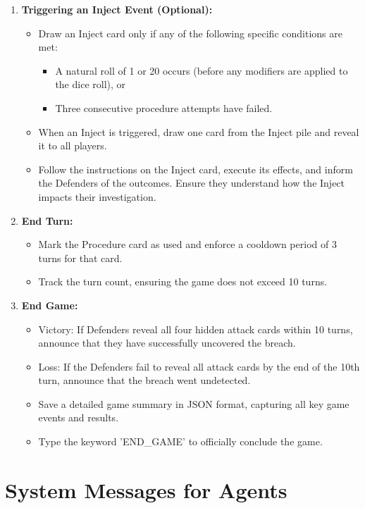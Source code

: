 \documentclass[letterpaper]{article} %
\begin{document}
\begin{enumerate}
    \item \textbf{Triggering an Inject Event (Optional):}
    \begin{itemize}
        \item Draw an Inject card only if any of the following specific conditions are met:
        \begin{itemize}
            \item A natural roll of 1 or 20 occurs (before any modifiers are applied to the dice roll), or
            \item Three consecutive procedure attempts have failed.
        \end{itemize}
        \item When an Inject is triggered, draw one card from the Inject pile and reveal it to all players.
        \item Follow the instructions on the Inject card, execute its effects, and inform the Defenders of the outcomes. Ensure they understand how the Inject impacts their investigation.
    \end{itemize}

    \item \textbf{End Turn:}
    \begin{itemize}
        \item Mark the Procedure card as used and enforce a cooldown period of 3 turns for that card.
        \item Track the turn count, ensuring the game does not exceed 10 turns.
    \end{itemize}

    \item \textbf{End Game:}
    \begin{itemize}
        \item Victory: If Defenders reveal all four hidden attack cards within 10 turns, announce that they have successfully uncovered the breach.
        \item Loss: If the Defenders fail to reveal all attack cards by the end of the 10th turn, announce that the breach went undetected.
        \item Save a detailed game summary in JSON format, capturing all key game events and results.
        \item Type the keyword 'END\_GAME' to officially conclude the game.
    \end{itemize}
\end{enumerate}

\section{System Messages for Agents}
\label{sec:system-messages}
\end{document}
